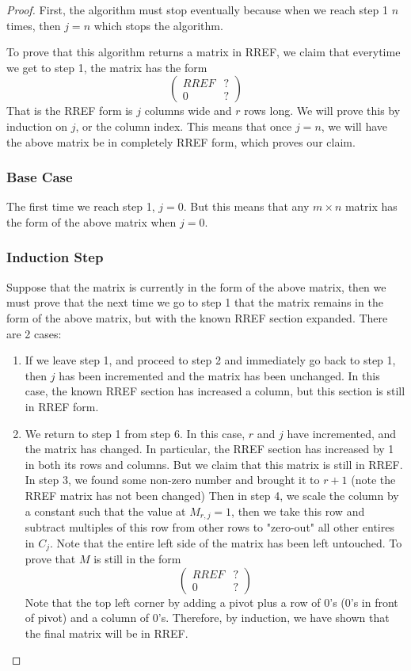 \documentclass{article}
\newtheorem{one minute paper}[theorem]{One Minute Paper}
\begin{document}
\begin{proof}
    First, the algorithm must stop eventually because when we reach step 1 $n$ times, then $j=n$ which stops the algorithm.

    To prove that this algorithm returns a matrix in RREF, we claim that everytime we get to step 1, the matrix has the form 
    \[\begin{pmatrix}
        RREF & ? \\ 
        0 & ?
    \end{pmatrix}
    \]
    That is the RREF form is $j$ columns wide and $r$ rows long. 
    We will prove this by induction on $j$, or the column index. This means that once $j=n$, we will have the above matrix be in completely RREF form, which proves our claim.

    \subsubsection*{Base Case} The first time we reach step 1, $j = 0$. But this means that any $m\times n$ matrix has the form of the above matrix when $j = 0$.

    \subsubsection*{Induction Step}

    Suppose that the matrix is currently in the form of the above matrix, then we must prove that the next time we go to step 1 that the matrix remains in the form of the above matrix, but with the known RREF section expanded. There are 2 cases:
    \begin{enumerate}
        \item If we leave step 1, and proceed to step 2 and immediately go back to step 1, then $j$ has been incremented and the matrix has been unchanged. In this case,
        the known RREF section has increased a column, but this section is still in RREF form.
        \item We return to step 1 from step 6. In this case, $r$ and $j$ have incremented, and the matrix has changed. In particular, the RREF section has increased by 1 in both its rows and columns. But we claim that this matrix is still in RREF. In step 3, we found some non-zero number and brought it to $r+1$ (note the RREF matrix has not been changed)
        Then in step 4, we scale the column by a constant such that the value at $M_{r,j} = 1$, then we take this row and subtract multiples of this row from other rows to "zero-out" all other entires in $C_j$. Note that the entire left side of the matrix has been left untouched. To prove that $M$ is still in the form 
        \[\begin{pmatrix}
            RREF & ? \\
            0 & ?
        \end{pmatrix}\]
        Note that the top left corner by adding a pivot plus a row of $0$'s ($0$'s in front of pivot) and a column of $0$'s. Therefore, by induction, we have shown that the final matrix will be in RREF. 
    \end{enumerate}
\end{proof}
\end{document}
